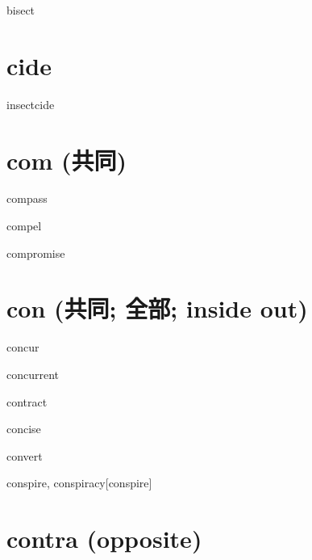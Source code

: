 \begin{RefWord}{bisect}
\end{RefWord}

\section{cide}

\begin{RefWord}{insectcide}
\end{RefWord}

\section{com (共同)}

\begin{RefWord}{compass}
\end{RefWord}

\begin{RefWord}{compel}
\end{RefWord}

\begin{RefWord}{compromise}
\end{RefWord}

\section{con (共同; 全部; inside out)}
\begin{RefWord}{concur}
\end{RefWord}

\begin{RefWord}{concurrent}
\end{RefWord}

\begin{RefWord}{contract}
\end{RefWord}

\begin{RefWord}{concise}
\end{RefWord}

\begin{RefWord}{convert}
\end{RefWord}

\begin{RefWord}{conspire, conspiracy}[conspire]
\end{RefWord}

\section{contra (opposite)}

